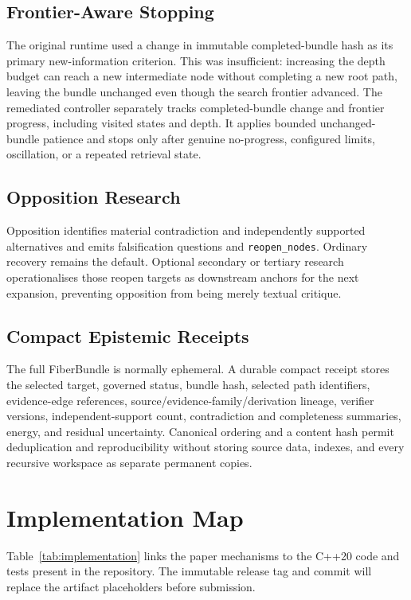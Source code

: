 \documentclass[10pt]{article}
\newcommand{\code}[1]{\texttt{#1}}
\begin{document}
\subsection{Frontier-Aware Stopping}
The original runtime used a change in immutable completed-bundle hash as its primary new-information criterion. This was insufficient: increasing the depth budget can reach a new intermediate node without completing a new root path, leaving the bundle unchanged even though the search frontier advanced. The remediated controller separately tracks completed-bundle change and frontier progress, including visited states and depth. It applies bounded unchanged-bundle patience and stops only after genuine no-progress, configured limits, oscillation, or a repeated retrieval state.

\subsection{Opposition Research}
Opposition identifies material contradiction and independently supported alternatives and emits falsification questions and \code{reopen\_nodes}. Ordinary recovery remains the default. Optional secondary or tertiary research operationalises those reopen targets as downstream anchors for the next expansion, preventing opposition from being merely textual critique.

\subsection{Compact Epistemic Receipts}
The full FiberBundle is normally ephemeral. A durable compact receipt stores the selected target, governed status, bundle hash, selected path identifiers, evidence-edge references, source/evidence-family/derivation lineage, verifier versions, independent-support count, contradiction and completeness summaries, energy, and residual uncertainty. Canonical ordering and a content hash permit deduplication and reproducibility without storing source data, indexes, and every recursive workspace as separate permanent copies.

\section{Implementation Map}
Table~\ref{tab:implementation} links the paper mechanisms to the C++20 code and tests present in the repository. The immutable release tag and commit will replace the artifact placeholders before submission.
\end{document}

